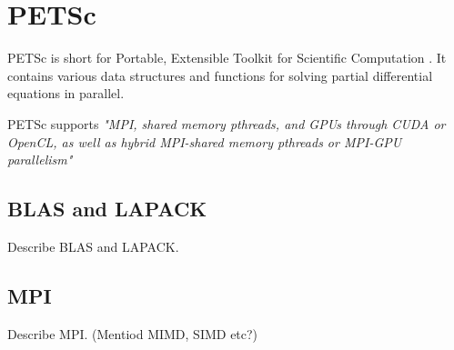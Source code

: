 \section*{PETSc}

PETSc is short for Portable, Extensible Toolkit for Scientific Computation 
\cite{PETScWebpage}. It contains various data structures and functions for 
solving partial differential equations in parallel. 

PETSc supports \emph{"MPI, shared memory pthreads, and GPUs through CUDA or OpenCL, as 
well as hybrid MPI-shared memory pthreads or MPI-GPU parallelism"}\cite{PETScWebpage}

\subsection*{BLAS and LAPACK}

Describe BLAS and LAPACK.

\subsection*{MPI}

Describe MPI. (Mentiod MIMD, SIMD etc?)

